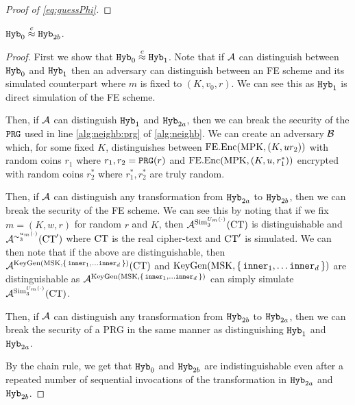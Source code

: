 \begin{proof}[Proof of \cref{eq:guessPhi}]
\end{proof}

\begin{lemma}
	\label{lem:hybrOneToFour}
	$\texttt{Hyb}_0 \overset{c}{\approx} \texttt{Hyb}_{2b}$.	
	\begin{proof}
		First we show that $\texttt{Hyb}_0 \overset{c}{\approx} \texttt{Hyb}_1$. Note that if $\mathcal{A}$ can distinguish
		between $\texttt{Hyb}_0$ and $\texttt{Hyb}_1$ then an adversary can distinguish between an FE scheme and its simulated counterpart
		where $m$ is fixed to $(K, v_0, r)$. We can see this as $\texttt{Hyb}_1$ is  direct simulation of the FE scheme.

		Then, if $\mathcal{A}$ can distinguish $\texttt{Hyb}_1$ and $\texttt{Hyb}_{2a}$, then we can break the security of the $\texttt{PRG}$ used in line \ref{alg:neighb:prg} of \cref{alg:neighb}.
		We can create an adversary $\mathcal{B}$ which, for some fixed $K$, distinguishes between $\text{FE.Enc}(\text{MPK}, (K, u r_2))$ with random coins $r_1$ where $r_1, r_2 = \texttt{PRG}(r)$
		and $\text{FE.Enc}(\text{MPK}, (K, u, r_1^*))$ encrypted with random coins $r_2^*$ where $r_1^*, r_2^*$ are truly random.

		Then, if $\mathcal{A}$ can distinguish any transformation from $\texttt{Hyb}_{2a}$ to $\texttt{Hyb}_{2b}$, then we can break the security of the FE scheme.
		We can see this by noting that if we fix $m = (K, w, r)$ for random $r$ and $K$,
		then $\mathcal{A}^{\text{Sim}_3^{U_m(\cdot)}}(\text{CT})$ is distinguishable
		and $\mathcal{A}^{\sim_3^{u_m(\cdot)}}(\text{CT}')$ where $\text{CT}$ is the real cipher-text and $\text{CT}'$ is simulated.
		We can then note that if the above are distinguishable, then
		$\mathcal{A}^{\text{KeyGen}(\text{MSK}, \set{\texttt{inner}_1, \dots \texttt{inner}_d})}(\text{CT})$ 
		and $\text{KeyGen}(\text{MSK}, \set{\texttt{inner}_1, \dots \texttt{inner}_d})$ are distinguishable
		as $\mathcal{A}^{\text{KeyGen}(\text{MSK}, \set{\texttt{inner}_1, \dots \texttt{inner}_d})}$ can simply simulate
		$\mathcal{A}^{\text{Sim}_3^{U_m(\cdot)}}(\text{CT})$.

		Then, if $\mathcal{A}$ can distinguish any transformation from $\texttt{Hyb}_{2b}$ to $\texttt{Hyb}_{2a}$, then we can break the security of a PRG
		in the same manner as distinguishing $\texttt{Hyb}_1$ and $\texttt{Hyb}_{2a}$.

		By the chain rule, we get that $\texttt{Hyb}_0$ and $\texttt{Hyb}_{2b}$ are indistinguishable even after a repeated
		number of sequential invocations of the transformation in $\texttt{Hyb}_{2a}$ and $\texttt{Hyb}_{2b}$.
	\end{proof}
\end{lemma}


